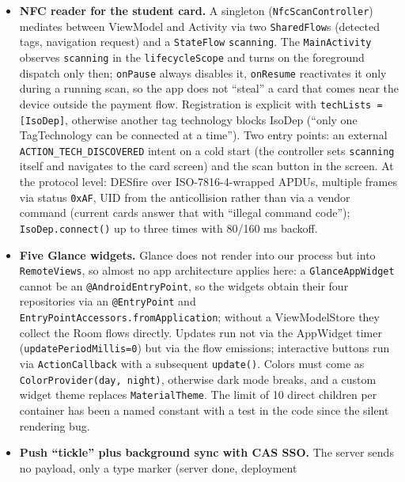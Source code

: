\documentclass{msereport}
\begin{document}
\begin{itemize}
  \item \textbf{NFC reader for the student card.} A singleton
        (\texttt{NfcScanController}) mediates between ViewModel and Activity
        via two \texttt{SharedFlow}s (detected tags, navigation request) and a
        \texttt{StateFlow} \texttt{scanning}. The \texttt{MainActivity}
        observes \texttt{scanning} in the \texttt{lifecycleScope} and turns on
        the foreground dispatch only then; \texttt{onPause} always disables it,
        \texttt{onResume} reactivates it only during a running scan, so the app
        does not ``steal'' a card that comes near the device outside the payment
        flow. Registration is explicit with \texttt{techLists = [IsoDep]},
        otherwise another tag technology blocks IsoDep (``only one TagTechnology
        can be connected at a time''). Two entry points: an external
        \texttt{ACTION\_TECH\_DISCOVERED} intent on a cold start (the controller
        sets \texttt{scanning} itself and navigates to the card screen) and the
        scan button in the screen. At the protocol level: DESfire over
        ISO-7816-4-wrapped APDUs, multiple frames via status \texttt{0xAF},
        UID from the anticollision rather than via a vendor command (current
        cards answer that with ``illegal command code'');
        \texttt{IsoDep.connect()} up to three times with 80/160 ms backoff.
  \item \textbf{Five Glance widgets.} Glance does not render into our process
        but into \texttt{RemoteViews}, so almost no app architecture applies
        here: a \texttt{GlanceAppWidget} cannot be an
        \texttt{@AndroidEntryPoint}, so the widgets obtain their four
        repositories via an \texttt{@EntryPoint} and
        \texttt{EntryPointAccessors.fromApplication}; without a ViewModelStore
        they collect the Room flows directly. Updates run not via the
        AppWidget timer (\texttt{updatePeriodMillis=0}) but via the
        flow emissions; interactive buttons run via \texttt{ActionCallback}
        with a subsequent \texttt{update()}. Colors must come as
        \texttt{ColorProvider(day, night)}, otherwise dark mode breaks,
        and a custom widget theme replaces \texttt{MaterialTheme}. The limit
        of 10 direct children per container has been a named constant with a
        test in the code since the silent rendering bug.
  \item \textbf{Push ``tickle'' plus background sync with CAS SSO.} The server
        sends no payload, only a type marker (server done, deployment

\end{itemize}
\end{document}
